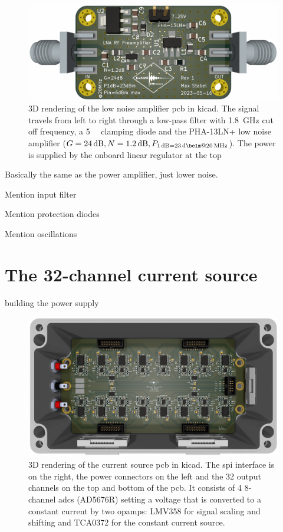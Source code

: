\begin{figure}[hbt]
    \centering
    \includegraphics[width=\textwidth]{images/preamp.png}
    \caption{ 3D rendering of the low noise amplifier \acrshort{pcb} in \gls{kicad}. The signal travels from left to right through a low-pass filter with \qty{1.8}{\giga\hertz} cut off frequency, a \qty{+5}{\deci\belm} clamping diode and the PHA-13LN+ low noise amplifier (\(G = \qty{24}{\deci\bel}, N = \qty{1.2}{\deci\bel}, P_{\qty{1}{\deci\bel} = \qty{23}{\deci\belm} @\qty{20}{\mega\hertz}}\)). The power is supplied by the onboard linear regulator at the top}
\end{figure}

Basically the same as the power amplifier, just lower noise.

Mention input filter

Mention protection diodes

Mention oscillations

\section{The 32-channel current source}
building the power supply
\begin{figure}[hbt]
    \centering
    \includegraphics[width=\textwidth]{images/32-channel_current_source.png}
    \caption{ 3D rendering of the current source \acrshort{pcb} in \gls{kicad}. The \acrshort{spi} interface is on the right, the power connectors on the left and the 32 output channels on the top and bottom of the \acrshort{pcb}. It consists of 4 8-channel \acrshort{adc}s (AD5676R) setting a voltage that is converted to a constant current by two \acrshort{opamp}s: LMV358 for signal scaling and shifting and TCA0372 for the constant current source.}
\end{figure}

